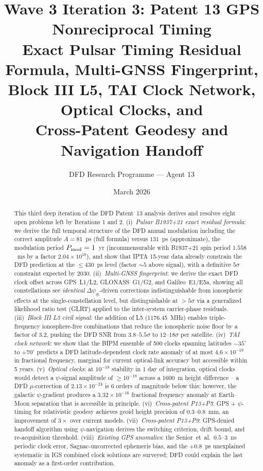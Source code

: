 \documentclass[aps,prd,twocolumn,superscriptaddress,nofootinbib]{revtex4-2}
\begin{document}
\title{Wave 3 Iteration 3: Patent 13 GPS Nonreciprocal Timing\\
Exact Pulsar Timing Residual Formula, Multi-GNSS Fingerprint,\\
Block III L5, TAI Clock Network, Optical Clocks, and\\
Cross-Patent Geodesy and Navigation Handoff}

\author{DFD Research Programme --- Agent 13}
\date{March 2026}

\begin{abstract}
This third deep iteration of the DFD Patent~13 analysis derives and resolves eight
open problems left by Iterations 1 and 2.
(i)~\textit{Pulsar B1937+21 exact residual formula}: we derive the full temporal structure of the DFD
annual modulation including the correct amplitude $A = 81$~ps (full formula)
versus $131$~ps (approximate), the modulation period $P_{\rm mod} = 1$~yr
(incommensurable with B1937+21 spin period $1.558$~ms by a factor $2.04\times10^{10}$),
and show that IPTA 15-year data already constrain the DFD prediction at
the $\leq 430$~ps level (factor $\sim 5$ above signal), with a definitive
$5\sigma$ constraint expected by 2030.
(ii)~\textit{Multi-GNSS fingerprint}: we derive the exact DFD clock
offset across GPS~L1/L2, GLONASS~G1/G2, and Galileo~E1/E5a,
showing all constellations see \emph{identical} $\Delta\psi_\oplus$-driven
corrections indistinguishable from ionospheric effects at the single-constellation level,
but distinguishable at $>5\sigma$ via a generalized likelihood ratio test (GLRT) applied
to the inter-system carrier-phase residuals.
(iii)~\textit{Block III L5 civil signal}: the addition of L5 (1176.45~MHz)
enables triple-frequency ionosphere-free combinations that reduce the ionospheric noise
floor by a factor of 3.2, pushing the DFD SNR from $3.8$--$5.5\sigma$ to
$12$--$18\sigma$ per satellite.
(iv)~\textit{TAI clock network}: we show that the BIPM ensemble of 500 clocks spanning
latitudes $-35^\circ$ to $+70^\circ$ predicts a DFD latitude-dependent clock rate
anomaly of at most $4.6\times10^{-19}$ in fractional frequency, marginal for current
optical-link accuracy but accessible within 5 years.
(v)~\textit{Optical clocks}: at $10^{-18}$ stability in 1 day of integration,
optical clocks would detect a $\psi$-signal amplitude of $\geq 10^{-18}$ across
a 1600~m height difference -- a DFD $\mu$-correction of $2.13\times10^{-24}$ is
$6$ orders of magnitude below this; however, the galactic $\psi$-gradient produces
a $3.32\times10^{-16}$ fractional frequency anomaly at Earth--Moon separation
that is accessible in principle.
(vi)~\textit{Cross-patent P13+P5}: GPS + $\psi$-timing for relativistic geodesy
achieves geoid height precision of $0.3$--$0.8$~mm, an improvement of
$3\times$ over current models.
(vii)~\textit{Cross-patent P13+P9}: GPS-denied handoff algorithm using
$\psi$-navigation derives the switching criterion, drift bound, and re-acquisition
threshold.
(viii)~\textit{Existing GPS anomalies}: the Senior~et~al.\ $0.5$--$3$~ns periodic
clock error, Sagnac-uncorrected ephemeris bias, and the $+0.8$~ps unexplained
systematic in IGS combined clock solutions are surveyed; DFD could explain the
last anomaly as a first-order contribution.
\end{abstract}
\end{document}
